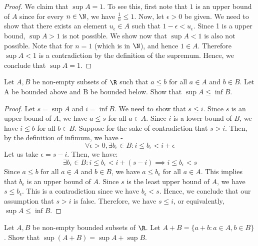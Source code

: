 \documentclass[openany]{book}
\begin{document}
\begin{proof}
    We claim that $\sup A = 1$. To see this, first note that $1$ is an upper bound of $A$ since for every $n \in \N$, we have $\frac{1}{n} \leq 1$. Now, let $\epsilon > 0$ be given. We need to show that there exists an element $u_\epsilon \in A$ such that $1 - \epsilon < u_\epsilon$. Since 1 is a upper bound, $\sup A > 1$ is not possible. We show now that $\sup A < 1$ is also not possible. Note that for $n = 1$ (which is in $\N$), and hence $1 \in A$. Therefore $\sup A < 1$ is a contradiction by the definition of the supremum. Hence, we conclude that $\sup A = 1$.
\end{proof}
\begin{exercise}
Let $A, B$ be non-empty subsets of $\R$ such that $a \leq b$ for all $a \in A$ and $b \in B$. Let A be bounded above and B be bounded below. Show that $\sup A \leq \inf B$.
\end{exercise}
\begin{proof}
    Let $s = \sup A$ and $i = \inf B$. We need to show that $s \leq i$. Since $s$ is an upper bound of $A$, we have $a \leq s$ for all $a \in A$. Since $i$ is a lower bound of $B$, we have $i \leq b$ for all $b \in B$. Suppose for the sake of contradiction that $s > i$. Then, by the definition of infimum, we have - 
    $$\forall \epsilon > 0, \exists b_\epsilon \in B: i \leq b_\epsilon < i + \epsilon$$
    Let us take $\epsilon = s - i$. Then, we have:
    $$\exists b_\epsilon \in B: i \leq b_\epsilon < i + (s - i) \implies i \leq b_\epsilon < s$$
    Since $a \leq b$ for all $a \in A$ and $b \in B$, we have $a \leq b_\epsilon$ for all $a \in A$. This implies that $b_\epsilon$ is an upper bound of $A$. Since $s$ is the least upper bound of $A$, we have $s \leq b_\epsilon$. This is a contradiction since we have $b_\epsilon < s$. Hence, we conclude that our assumption that $s > i$ is false. Therefore, we have $s \leq i$, or equivalently, $\sup A \leq \inf B$.
\end{proof}
\begin{exercise}
    Let $A, B$ be non-empty bounded subsets of $\R$. Let $A + B = \{a + b : a \in A, b \in B\}$. Show that $\sup (A + B) = \sup A + \sup B$.
\end{exercise}
\end{document}
